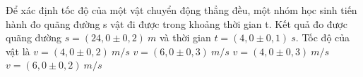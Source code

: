\begin{ex}%
Để xác định tốc độ của một vật chuyển động thẳng đều, một nhóm học sinh tiến hành đo quãng đường s vật đi được trong khoảng thời gian t. Kết quả đo được quãng đường $s=(24,0 \pm 0,2)\ m$ và thời gian $t=(4,0 \pm 0,1)\ s$. Tốc độ của vật là
\choice
{$v=(4,0 \pm 0,2)\ m/s$}
{$v=(6,0 \pm 0,3)\ m/s$}
{$v=(4,0 \pm 0,3)\ m/s$}
{\True $v=(6,0 \pm 0,2)\ m/s$}
\loigiai{
}
 \end{ex}



































